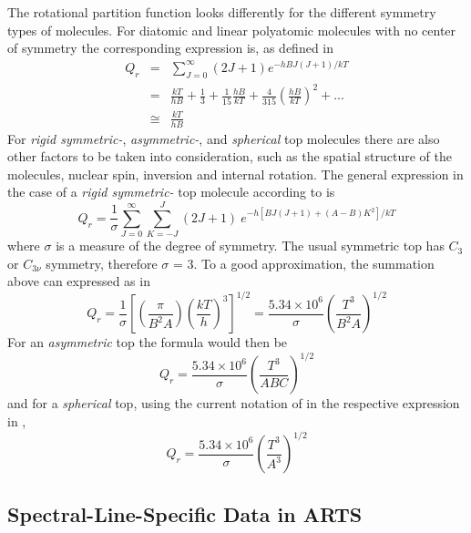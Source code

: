 The rotational partition function looks differently for the different
symmetry types of molecules.
For diatomic and linear  polyatomic molecules with no center of
symmetry the corresponding expression is, as defined in \citet{gordyandcook:70}
\begin{eqnarray}\label{rot_partition}
Q_r & = & \sum_{J=0}^\infty (2J+1)e^{-hBJ(J+1)/kT}\nonumber\\
   & = & \frac{kT}{hB}+\frac{1}{3}+\frac{1}{15}\frac{hB}{kT}+\frac{4}{315}\left(\frac{hB}{kT}\right)^2+...\nonumber\\
   & \cong & \frac{kT}{hB}
\end{eqnarray}
For {\it{ rigid symmetric-}}, {\it{asymmetric-}}, and {\it{spherical}} top molecules there are also
other factors to be taken into consideration, such as the
spatial structure of the molecules, nuclear spin, inversion and
internal rotation. The general expression in the case of a 
{\it{ rigid symmetric-}} top molecule according to \citet{herzberg:45}
is
\begin{equation}\label{rot_partition_symtop}
Q_r  =  \frac{1}{\sigma}\sum_{J=0}^\infty \sum_{K=-J}^{J}(2J+1)~e^{-h[BJ(J+1)+(A-B)K^2]/kT}
\end{equation}
where $\sigma$ is a measure of the degree of symmetry. The usual
symmetric top has $C_3$ or $C_{3\nu}$ symmetry, therefore $\sigma$ = 3. To a good
approximation, the summation above can expressed as in \citet{gordyandcook:70}
\begin{equation}\label{rot_partition_top_appro}
Q_r  = 
\frac{1}{\sigma}\left[\left(\frac{\pi}{B^2A}\right)\left(\frac{kT}{h}\right)^3\right]^{1/2}=
\frac{5.34\times 10^6}{\sigma}\left(\frac{T^3}{B^{2}A}\right)^{1/2}
\end{equation}
For an  {\it{asymmetric}} top the formula would then be 
\begin{equation}\label{rot_partition_asymtop}
Q_r = \frac{5.34\times 10^6}{\sigma}\left(\frac{T^3}{ABC}\right)^{1/2}
\end{equation}
and for a {\it{spherical}} top, using the current notation of
\citet{gordyandcook:70} in the respective expression in \citet{herzberg:45},
\begin{equation}\label{rot_partition_sphetop}
Q_r = \frac{5.34\times 10^6}{\sigma}\left(\frac{T^3}{A^3}\right)^{1/2}
\end{equation}


\subsection{Spectral-Line-Specific Data in ARTS} 

